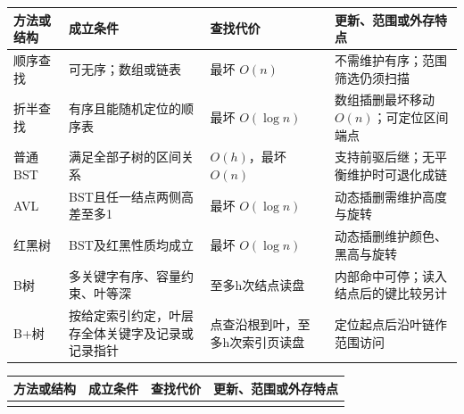 \begin{wideblock}

\par\medskip\noindent\begin{minipage}{\linewidth}\fontsize{9.3}{12}\selectfont\begin{tabularx}{\linewidth}{@{}YYYY@{}}
\toprule\noalign{}
\begin{minipage}[b]{\linewidth}\raggedright
方法或结构
\end{minipage} & \begin{minipage}[b]{\linewidth}\raggedright
成立条件
\end{minipage} & \begin{minipage}[b]{\linewidth}\raggedright
查找代价
\end{minipage} & \begin{minipage}[b]{\linewidth}\raggedright
更新、范围或外存特点
\end{minipage} \\
\midrule\noalign{}


顺序查找 & 可无序；数组或链表 & 最坏 \(O(n)\) & 不需维护有序；范围筛选仍须扫描 \\
折半查找 & 有序且能随机定位的顺序表 & 最坏 \(O(\log n)\) & 数组插删最坏移动 \(O(n)\)；可定位区间端点 \\
普通BST & 满足全部子树的区间关系 & \(O(h)\)，最坏 \(O(n)\) & 支持前驱后继；无平衡维护时可退化成链 \\
AVL & BST且任一结点两侧高差至多1 & 最坏 \(O(\log n)\) & 动态插删需维护高度与旋转 \\
红黑树 & BST及红黑性质均成立 & 最坏 \(O(\log n)\) & 动态插删维护颜色、黑高与旋转 \\
B树 & 多关键字有序、容量约束、叶等深 & 至多h次结点读盘 & 内部命中可停；读入结点后的键比较另计 \\
B+树 & 按给定索引约定，叶层存全体关键字及记录或记录指针 & 点查沿根到叶，至多h次索引页读盘 & 定位起点后沿叶链作范围访问 \\
\bottomrule\end{tabularx}
\end{minipage}\par\medskip

\par\medskip\noindent\begin{minipage}{\linewidth}\fontsize{9.3}{12}\selectfont\begin{tabularx}{\linewidth}{@{}YYYY@{}}
\toprule\noalign{}
\begin{minipage}[b]{\linewidth}\raggedright
方法或结构
\end{minipage} & \begin{minipage}[b]{\linewidth}\raggedright
成立条件
\end{minipage} & \begin{minipage}[b]{\linewidth}\raggedright
查找代价
\end{minipage} & \begin{minipage}[b]{\linewidth}\raggedright
更新、范围或外存特点
\end{minipage} \\
\midrule\noalign{}



\end{tabularx}
\end{minipage}
\end{wideblock}
